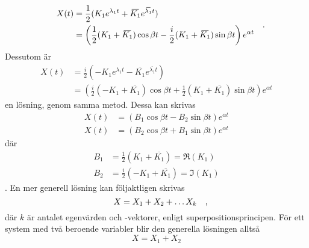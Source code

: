 \begin{equation}
    \begin{split}
        X(t)&=\frac{1}{2}(K_1e^{\lambda_1 t}+\overbar{K_1}e^{\overbar{\lambda_1}t})\\
        &=\left(\frac{1}{2}(K_1+\overbar{K_1})\cos\beta t-\frac{i}{2}(K_1+\overbar{K_1})\sin\beta t\right)e^{\alpha t}
    \end{split}
\eqph{.}\end{equation}
Dessutom är 
\begin{equation}
    \begin{split}
        X(t)&=\frac{i}{2}(-K_1e^{\lambda_1 t}-\overbar{K_1}e^{\overbar{\lambda_1}t})\\
        &=\left(\frac{i}{2}(-K_1+\overbar{K_1})\cos\beta t+\frac{1}{2}(K_1+\overbar{K_1})\sin\beta t\right)e^{\alpha t}
    \end{split}
\end{equation} en lösning, genom samma metod. Dessa kan skrivas
\begin{equation}
    \begin{split}\label{eq:sol_of_ode_complex_eigenvalues}
        X(t)&=(B_1\cos\beta t-B_2\sin\beta t)e^{\alpha t}\\
        X(t)&=(B_2\cos\beta t+B_1\sin\beta t)e^{\alpha t}
    \end{split}
\end{equation} där
\begin{equation}
    \begin{split}
        B_1&=\frac{1}{2}(K_1+\overbar{K_1})=\Re(K_1)\\
        B_2&=\frac{i}{2}(-K_1+\overbar{K_1})=\Im(K_1)
    \end{split}
\end{equation} \parencite[348]{zill_differential_2005}. En mer generell lösning kan följaktligen skrivas
\begin{equation}\label{eq:general_sol_of_ode_complex_eigenvalues}
    X=X_1+X_2+\hdots X_k
\quad\mathrm{,}\!\!\!\!\!\!\end{equation} där \(k\) är antalet egenvärden och -vektorer, enligt superpositionsprincipen. För ett system med två beroende variabler blir den generella lösningen alltså
\begin{equation}
    X=X_1+X_2
\end{equation}

